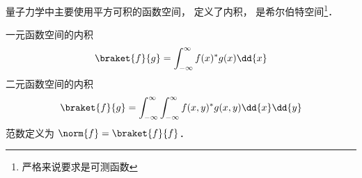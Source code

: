 
量子力学中主要使用平方可积的函数空间， 定义了内积， 是希尔伯特空间\footnote{严格来说要求是可测函数}．

一元函数空间的内积
\begin{equation}
\braket{f}{g} = \int_{-\infty}^{\infty} f(x)^* g(x) \dd{x}
\end{equation}
二元函数空间的内积
\begin{equation}
\braket{f}{g} = \int_{-\infty}^{\infty}\int_{-\infty}^{\infty} f(x, y)^* g(x, y) \dd{x}\dd{y}
\end{equation}
范数定义为 $\norm{f} = \braket{f}{f}$．

